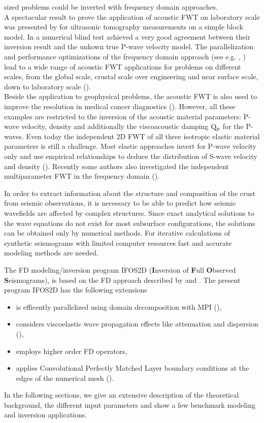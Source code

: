 sized problems could be inverted with frequency domain approaches.\\ A spectacular result to prove the application of acoustic FWT on laboratory scale was presented by \cite{pratt:99} for ultrasonic tomography measurements on a simple block model. In a numerical blind test \cite{brenders:2007} achieved a very good agreement between their inversion result and the unkown true P-wave velocity model. The parallelization and performance optimizations of the frequency domain approach (see e.g. \cite{sourbier:09}, \cite{sourbier:09b}) lead to a wide range of acoustic FWT applications for problems on different scales, from the global scale, crustal scale over engineering and near surface scale, down to laboratory scale (\cite{pratt:2004}).\\ Beside the application to geophysical problems, the acoustic FWT is also used to improve the resolution in medical cancer diagnostics (\cite{pratt:2007}). However, all these examples are restricted to the inversion of the acoustic material parameters: P-wave velocity, density and additionally the viscoacoustic damping $\rm{Q_p}$ for the P-waves. Even today the independent 2D FWT of all three isotropic elastic material parameters is still a challenge. Most elastic approaches invert for P-wave velocity only and use empirical relationships to deduce the distribution of S-wave velocity and density (\cite{shipp:02,sheen:06}). Recently some authors also investigated the independent multiparameter FWT in the frequency domain (\cite{choi:2008,choi:2008a,brossier:2009}).  

In order to extract information about the structure and composition of the crust from seismic observations, it is necessary to be able to predict how seismic wavefields are affected by complex structures.
Since exact analytical solutions to the wave equations do not exist for most subsurface configurations, the solutions can be obtained only by numerical methods. For iterative calculations of synthetic seismograms with limited computer resources fast and accurate modeling methods are needed. 

The FD modeling/inversion program IFOS2D (\textbf{I}nversion of \textbf{F}ull \textbf{O}bserved \textbf{S}eismograms), is based on the FD approach described by \cite{virieux:86} and \cite{levander:88}. The present program IFOS2D has the following extensions

\begin{itemize}
\item is efficently parallelized using domain decomposition with MPI (\cite{bohlen:02}),
\item considers viscoelastic wave propagation effects like attenuation and dispersion
(\cite{robertsson:94,blanch:95,bohlen:02}),
\item employs higher order FD operators,
\item applies Convolutional Perfectly Matched Layer boundary conditions at the edges of the numerical mesh (\cite{komatitsch:07}).
\end{itemize}

In the following sections, we give an extensive description of the theoretical background, the different input parameters and show a few benchmark modeling and inversion applications.

